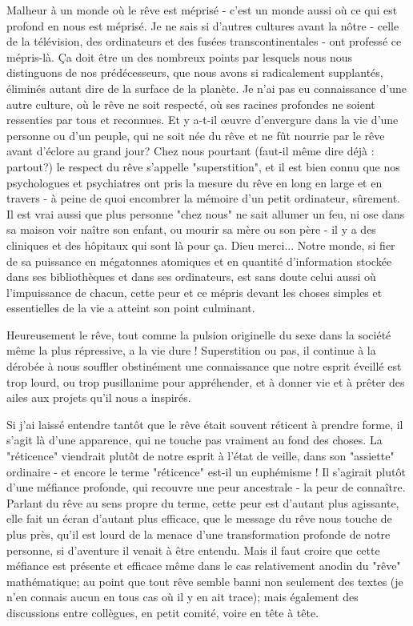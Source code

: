 Malheur à un monde où le rêve est méprisé - c'est un monde aussi où ce qui est profond en nous est méprisé. Je ne sais si d'autres cultures avant la nôtre - celle de la télévision, des ordinateurs et des fusées transcontinentales - ont professé ce mépris-là. Ça doit être un des nombreux points par lesquels nous nous distinguons de nos prédécesseurs, que nous avons si radicalement supplantés, éliminés autant dire de la surface de la planète. Je n'ai pas eu connaissance d'une autre culture, où le rêve ne soit respecté, où ses racines profondes ne soient ressenties par tous et reconnues. Et y a-t-il œuvre d'envergure dans la vie d'une personne ou d'un peuple, qui ne soit née du rêve et ne fût nourrie par le rêve avant d'éclore au grand jour? Chez nous pourtant (faut-il même dire déjà : partout?) le respect du rêve s'appelle "superstition", et il est bien connu que nos psychologues et psychiatres ont pris la mesure du rêve en long en large et en travers - à peine de quoi encombrer la mémoire d'un petit ordinateur, sûrement. Il est vrai aussi que plus personne "chez nous" ne sait allumer un feu, ni ose dans sa maison voir naître son enfant, ou mourir sa mère ou son père - il y a des cliniques et des hôpitaux qui sont là pour ça. Dieu merci... Notre monde, si fier de sa puissance en mégatonnes atomiques et en quantité d'information stockée dans ses bibliothèques et dans ses ordinateurs, est sans doute celui aussi où l'impuissance de chacun, cette peur et ce mépris devant les choses simples et essentielles de la vie a atteint son point culminant.

Heureusement le rêve, tout comme la pulsion originelle du sexe dans la société même la plus répressive, a la vie dure ! Superstition ou pas, il continue à la dérobée à nous souffler obstinément une connaissance que notre esprit éveillé est trop lourd, ou trop pusillanime pour appréhender, et à donner vie et à prêter des ailes aux projets qu'il nous a inspirés.

Si j'ai laissé entendre tantôt que le rêve était souvent réticent à prendre forme, il s'agit là d'une apparence, qui ne touche pas vraiment au fond des choses. La "réticence" viendrait plutôt de notre esprit à l'état de veille, dans son "assiette" ordinaire - et encore le terme "réticence" est-il un euphémisme ! Il s'agirait plutôt d'une méfiance profonde, qui recouvre une peur ancestrale - la peur de connaître. Parlant du rêve au sens propre du terme, cette peur est d'autant plus agissante, elle fait un écran d'autant plus efficace, que le message du rêve nous touche de plus près, qu'il est lourd de la menace d'une transformation profonde de notre personne, si d'aventure il venait à être entendu. Mais il faut croire que cette méfiance est présente et efficace même dans le cas relativement anodin du "rêve" mathématique; au point que tout rêve semble banni non seulement des textes (je n'en connais aucun en tous cas où il y en ait trace); mais également des discussions entre collègues, en petit comité, voire en tête à tête.

